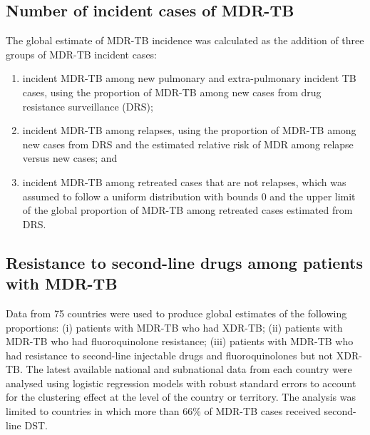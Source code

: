 \subsection{Number of incident cases of MDR-TB}

The global estimate of MDR-TB incidence was calculated as the addition of three groups of MDR-TB incident cases:
\begin{enumerate}
\item incident MDR-TB among new pulmonary and extra-pulmonary incident TB cases, using the proportion of MDR-TB among new cases from drug resistance surveillance (DRS); 
\item incident MDR-TB among relapses, using the proportion of MDR-TB among new cases from DRS and the estimated relative risk of MDR among relapse versus new cases; and
\item incident MDR-TB among retreated cases that are not relapses, which was assumed to follow a uniform distribution with bounds 0 and the upper limit of the global proportion of MDR-TB among retreated cases estimated from DRS. 
\end{enumerate}


\subsection{Resistance to second-line drugs among patients with MDR-TB}

Data from 75 countries were used to produce global estimates of the following proportions: (i) patients with MDR-TB who had XDR-TB; (ii) patients with MDR-TB who had fluoroquinolone resistance; (iii) patients with MDR-TB who had resistance to second-line injectable drugs and fluoroquinolones but not XDR-TB. The latest available national and subnational data from each country were analysed using logistic regression models with robust standard errors to account for the clustering effect at the level of the country or territory. The analysis was limited to countries in which more than 66\% of MDR-TB cases received second-line DST.




